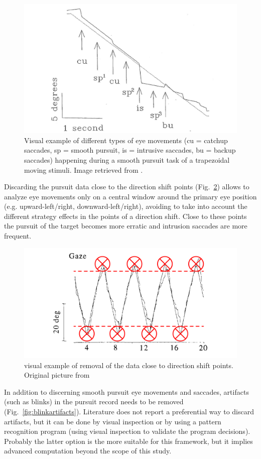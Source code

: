 \begin{figure}[h]
  \centering
  \includegraphics[width=.65\textwidth]{figures/intrusivesaccades-04.jpg}
  \caption[Saccades during smooth pursuit]{Visual example of different types of eye movements (cu = catchup saccades, sp = smooth pursuit, is = intrusive saccades, bu = backup saccades) happening during a smooth pursuit task of a trapezoidal moving stimuli. Image retrieved from \cite{randal1993smooth}.}
  \label{fig:intrusivesaccades}
\end{figure}

Discarding the pursuit data close to the direction shift points (Fig.~\ref{fig:dirchange}) allows to analyze eye movements only on a central window around the primary eye position (e.g. upward-left/right, downward-left/right), avoiding to take into account the different strategy effects in the points of a direction shift. Close to these points the pursuit of the target becomes more erratic and intrusion saccades are more frequent.

\begin{figure}[h]
  \centering
  \includegraphics[width=.45\textwidth]{figures/turningpoints-05.jpg}
  \caption[Discard data at turning points]{visual example of removal of the data close to direction shift points. Original picture from \cite{vonhofsten1997smoothpursuit}}
  \label{fig:dirchange}
\end{figure}

In addition to discerning smooth pursuit eye movements and saccades, artifacts (such as blinks) in the pursuit record needs to be removed (Fig.~\ref{fig:blinkartifacts}). Literature does not report a preferential way to discard artifacts, but it can be done by visual inspection or by using a pattern recognition program (using visual inspection to validate the program decisions). Probably the latter option is the more suitable for this framework, but it implies advanced computation beyond the scope of this study.

